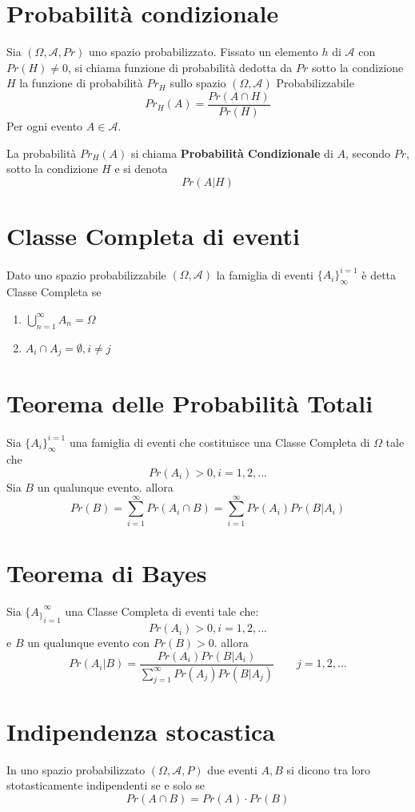 \documentclass[12pt]{report}
\begin{document}
  \section{Probabilità condizionale}
  Sia $(\Omega, \mathcal{A}, Pr)$ uno spazio probabilizzato. Fissato un elemento $h$ di $\mathcal{A}$ con $Pr(H) \neq 0$, si chiama funzione di probabilità dedotta da $Pr$ sotto la condizione $H$ la funzione di probabilità $Pr_H$ sullo spazio $(\Omega, \mathcal{A})$ Probabilizzabile
  \[ Pr_H(A) = \frac{Pr(A \cap H)}{Pr(H)} \]
  Per ogni evento $A \in \mathcal{A}$.

  La probabilità $Pr_H(A)$ si chiama \textbf{Probabilità Condizionale} di $A$, secondo $Pr$, sotto la condizione $H$ e si denota
  \[ Pr(A|H) \]

  \section{Classe Completa di eventi}
  Dato uno spazio probabilizzabile $(\Omega, \mathcal{A})$ la famiglia di eventi ${\{A_i\}_\infty^{i=1}}$ è detta Classe Completa se
  \begin{enumerate}
    \item $\bigcup\limits_{n=1}^{\infty} A_n = \Omega$
    \item $A_i \cap A_j = \emptyset,  i \neq j$
  \end{enumerate}

  \section{Teorema delle Probabilità Totali}
  Sia ${\{A_i\}_\infty^{i=1}}$ una famiglia di eventi che costituisce una Classe Completa di $\Omega$ tale che
  \[ Pr(A_i) > 0, i = 1,2,... \]
  Sia $B$ un qualunque evento. allora
  \[ Pr(B) = \sum_{i=1}^\infty Pr(A_i \cap B) = \sum_{i=1}^\infty Pr(A_i)Pr(B|A_i) \]

  \section{Teorema di Bayes}
  Sia ${\{A_\}}_{i=1}^\infty$ una Classe Completa di eventi tale che:\\
  $$Pr(A_i) > 0, i = 1,2,...$$
  e $B$ un qualunque evento con $Pr(B)>0$. allora
  $$Pr(A_i|B)=\frac{Pr(A_i)Pr(B|A_i)}{\sum_{j=1}^\infty Pr(A_j)Pr(B|A_j)} \qquad j=1,2,...  $$

  \section{Indipendenza stocastica}
  In uno spazio probabilizzato $(\Omega, \mathcal{A}, P)$ due eventi $A,B$ si dicono tra loro stotasticamente indipendenti se e solo se
  $$Pr(A \cap B) = Pr(A) \cdot Pr(B)$$
\end{document}

